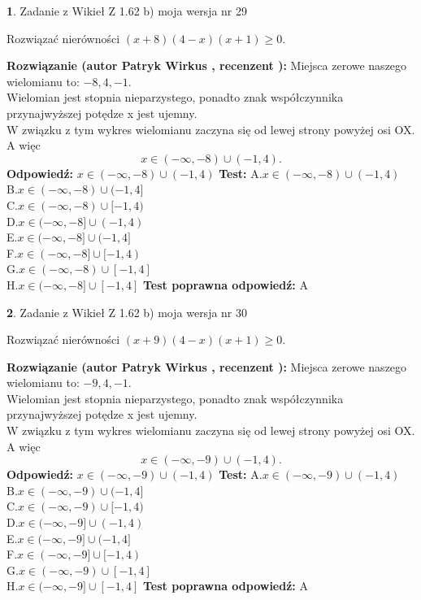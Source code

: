 \documentclass[12pt, a4paper]{article}
\theoremstyle{definition} %
\newtheorem{zad}{}
\newcommand{\zadStart}[1]{\begin{zad}#1\newline}
\newcommand{\zadStop}{\end{zad}}
\newcommand{\rozwStart}[2]{\noindent \textbf{Rozwiązanie (autor #1 , recenzent #2): }\newline}
\newcommand{\rozwStop}{\newline}
\newcommand{\odpStart}{\noindent \textbf{Odpowiedź:}\newline}
\newcommand{\odpStop}{\newline}
\newcommand{\testStart}{\noindent \textbf{Test:}\newline}
\newcommand{\testStop}{\newline}
\newcommand{\kluczStart}{\noindent \textbf{Test poprawna odpowiedź:}\newline}
\newcommand{\kluczStop}{\newline}
\begin{document}
\zadStart{Zadanie z Wikieł Z 1.62 b) moja wersja nr 29}

Rozwiązać nierówności $(x+8)(4-x)(x+1)\ge0$.
\zadStop
\rozwStart{Patryk Wirkus}{}
Miejsca zerowe naszego wielomianu to: $-8, 4, -1$.\\
Wielomian jest stopnia nieparzystego, ponadto znak współczynnika przy\linebreak najwyższej potędze x jest ujemny.\\ W związku z tym wykres wielomianu zaczyna się od lewej strony powyżej osi OX. A więc $$x \in (-\infty,-8) \cup (-1,4).$$
\rozwStop
\odpStart
$x \in (-\infty,-8) \cup (-1,4)$
\odpStop
\testStart
A.$x \in (-\infty,-8) \cup (-1,4)$\\
B.$x \in (-\infty,-8) \cup (-1,4]$\\
C.$x \in (-\infty,-8) \cup [-1,4)$\\
D.$x \in (-\infty,-8] \cup (-1,4)$\\
E.$x \in (-\infty,-8] \cup (-1,4]$\\
F.$x \in (-\infty,-8] \cup [-1,4)$\\
G.$x \in (-\infty,-8) \cup [-1,4]$\\
H.$x \in (-\infty,-8] \cup [-1,4]$
\testStop
\kluczStart
A
\kluczStop



\zadStart{Zadanie z Wikieł Z 1.62 b) moja wersja nr 30}

Rozwiązać nierówności $(x+9)(4-x)(x+1)\ge0$.
\zadStop
\rozwStart{Patryk Wirkus}{}
Miejsca zerowe naszego wielomianu to: $-9, 4, -1$.\\
Wielomian jest stopnia nieparzystego, ponadto znak współczynnika przy\linebreak najwyższej potędze x jest ujemny.\\ W związku z tym wykres wielomianu zaczyna się od lewej strony powyżej osi OX. A więc $$x \in (-\infty,-9) \cup (-1,4).$$
\rozwStop
\odpStart
$x \in (-\infty,-9) \cup (-1,4)$
\odpStop
\testStart
A.$x \in (-\infty,-9) \cup (-1,4)$\\
B.$x \in (-\infty,-9) \cup (-1,4]$\\
C.$x \in (-\infty,-9) \cup [-1,4)$\\
D.$x \in (-\infty,-9] \cup (-1,4)$\\
E.$x \in (-\infty,-9] \cup (-1,4]$\\
F.$x \in (-\infty,-9] \cup [-1,4)$\\
G.$x \in (-\infty,-9) \cup [-1,4]$\\
H.$x \in (-\infty,-9] \cup [-1,4]$
\testStop
\kluczStart
A
\kluczStop
\end{document}
